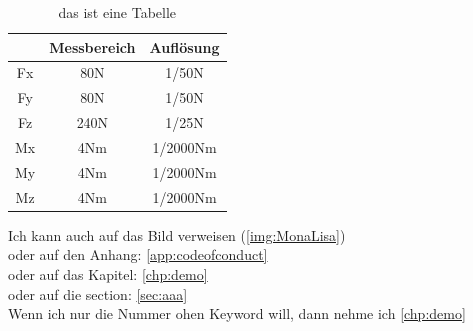 \begin{table}[H]
\centering
\begin{tabular}{|c|c|c|}
	\hline & Messbereich & Auflösung\\ 
	\hline Fx & 80N   & 1/50N\\ 
	\hline Fy & 80N   & 1/50N\\ 
	\hline Fz & 240N  & 1/25N\\ 
	\hline Mx & 4Nm   & 1/2000Nm\\ 
	\hline My & 4Nm   & 1/2000Nm\\ 
	\hline Mz & 4Nm   & 1/2000Nm\\
	\hline 
\end{tabular} 
\caption{das ist eine Tabelle}
\label{tbl:Tabelle}
\end{table}


Ich kann auch auf das Bild verweisen (\autoref{img:MonaLisa})\\
oder auf den Anhang: \autoref{app:codeofconduct} \\
oder auf das Kapitel: \autoref{chp:demo}\\
oder auf die section: \autoref{sec:aaa}\\
Wenn ich nur die Nummer ohen Keyword will, dann nehme ich \ref{chp:demo}

